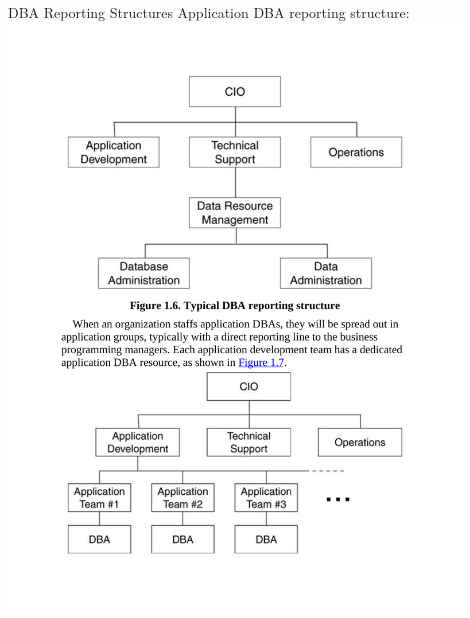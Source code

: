 \documentclass{beamer}
\begin{document}
\begin{frame}{DBA Reporting Structures}
    Application DBA reporting structure:\\
    \vspace{5mm}
    \centering
    \includegraphics[width=0.9\textwidth, trim={2.55cm 2.60cm 2.55cm 16.50cm}, clip]{figures/dba_reporting1}
\end{frame}
\end{document}

